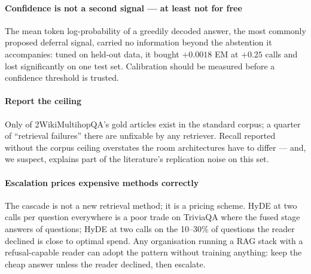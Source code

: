 \paragraph{Confidence is not a second signal --- at least not for free}
The mean token log-probability of a greedily decoded answer, the most
commonly proposed deferral signal, carried no information beyond the
abstention it accompanies: tuned on held-out data, it bought $+0.0018$ EM
at $+0.25$ calls and lost significantly on one test set. Calibration
should be measured before a confidence threshold is trusted.

\paragraph{Report the ceiling} Only \CoverageTwoWikiRecallCeiling{} of
2WikiMultihopQA's gold articles exist in the standard corpus; a quarter
of ``retrieval failures'' there are unfixable by any retriever. Recall
reported without the corpus ceiling overstates the room architectures
have to differ --- and, we suspect, explains part of the literature's
replication noise on this set.

\paragraph{Escalation prices expensive methods correctly} The cascade is
not a new retrieval method; it is a pricing scheme. HyDE at two calls per
question everywhere is a poor trade on TriviaQA where the fused stage
answers \CascadeTriviaQAStageFused{} of \CascadeTriviaQAQuestions{}
questions; HyDE at two calls on the 10--30\% of questions the reader
declined is close to optimal spend. Any organisation running a RAG stack
with a refusal-capable reader can adopt the pattern without training
anything: keep the cheap answer unless the reader declined, then escalate.
